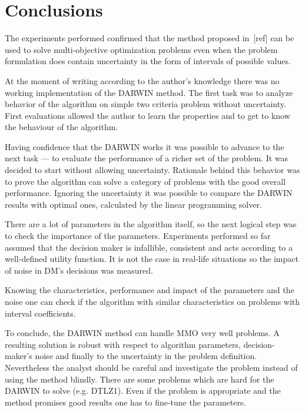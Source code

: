 \section{Conclusions}

The experiments performed confirmed that the method proposed in~[ref] can be
used to solve multi-objective optimization problems even when the problem
formulation does contain uncertainty in the form of intervals of possible
values.

At the moment of writing according to the author's knowledge there was no
working implementation of the DARWIN method. The first task was to analyze
behavior of the algorithm on simple two criteria problem without
uncertainty. First evaluations allowed the author to learn the properties and
to get to know the behaviour of the algorithm.

Having confidence that the DARWIN works it was possible to advance to the next
task --- to evaluate the performance of a richer set of the problem. It was
decided to start without allowing uncertainty. Rationale behind this behavior
was to prove the algorithm can solve a category of problems with the good
overall performance. Ignoring the uncertainty it was possible to compare the
DARWIN results with optimal ones, calculated by the linear programming solver.

There are a lot of parameters in the algorithm itself, so the next logical
step was to check the importance of the parameters. Experiments performed so
far assumed that the decision maker is infallible, consistent and acts
according to a well-defined utility function. It is not the case in real-life
situations so the impact of noise in DM's decisions was measured.

Knowing the characteristics, performance and impact of the parameters and the
noise one can check if the algorithm with similar characteristics on problems
with interval coefficients.

To conclude, the DARWIN method can handle MMO very well problems. A resulting
solution is robust with respect to algorithm parameters, decision-maker's
noise and finally to the uncertainty in the problem definition. Nevertheless
the analyst should be careful and investigate the problem instead of using the
method blindly. There are some problems which are hard for the DARWIN to solve
(e.g. DTLZ1). Even if the problem is appropriate and the method promises good
results one has to fine-tune the parameters.
